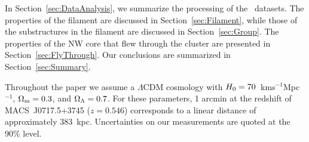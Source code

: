 In Section~\ref{sec:DataAnalysis}, we summarize the processing of the \chandra\ datasets. The properties of the filament are discussed in Section~\ref{sec:Filament}, while those of the substructures in the filament are discussed in Section~\ref{sec:Group}. The properties of the NW core that flew through the cluster are presented in Section~\ref{sec:FlyThrough}. Our conclusions are summarized in Section~\ref{sec:Summary}.

Throughout the paper we assume a $\Lambda$CDM cosmology with $H_{\rm 0} = 70$~km\;s$^{-1}$\;Mpc$^{-1}$, $\Omega_{\rm m} = 0.3$, and $\Omega_{\rm \Lambda} = 0.7$. For these parameters, 1 arcmin at the redshift of MACS~J0717.5+3745 ($z=0.546$) corresponds to a linear distance of approximately 383~kpc. Uncertainties on our measurements are quoted at the $90\%$ level.


